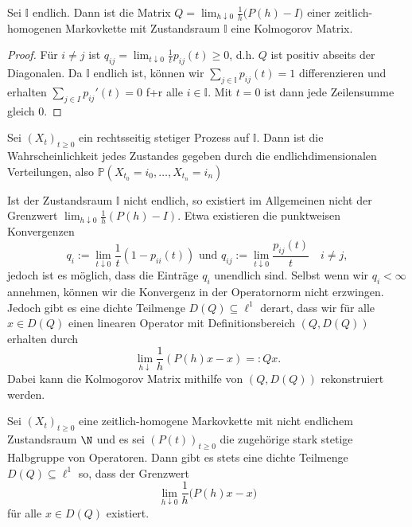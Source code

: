 \begin{prop}
Sei $\mathbb I$ endlich. Dann ist die Matrix $Q=\lim_{h\downarrow 0}\frac{1}{h}\big(P(h)-I\big)$ einer zeitlich-homogenen Markovkette mit Zustandsraum $\mathbb I$  eine Kolmogorov Matrix.
\end{prop}

\begin{proof}
Für $i\neq j$ ist $q_{ij}=\lim_{t\downarrow 0}\frac{1}{t}p_{ij}(t)\geq0$, d.h. $Q$ ist positiv abseits der Diagonalen. Da $\mathbb I$ endlich ist, können wir  $\sum_{j\in \mathbb I}p_{ij}(t)=1$ differenzieren und erhalten $\sum_{j\in I}p_{ij}'(t)=0$ f+r alle $i\in \mathbb I$. Mit $t=0$ ist dann jede Zeilensumme gleich $0$. 
\end{proof}



\begin{satz}
  Sei $(X_t)_{t\geq0}$ ein rechtsseitig stetiger Prozess auf $\mathbb I$. Dann ist die Wahrscheinlichkeit jedes Zustandes gegeben durch die endlichdimensionalen Verteilungen, also $\mathbb P(X_{t_0}=i_0,\dots,X_{t_n}=i_n)$ 
\end{satz}




\begin{bem}
Ist der Zustandsraum $\mathbb I$ nicht endlich, so existiert im Allgemeinen nicht der Grenzwert $\lim_{h\downarrow 0}\frac{1}{h}(P(h)-I)$. Etwa existieren die punktweisen Konvergenzen  $$q_i:=\lim_{t\downarrow0}\frac{1}{t}(1-p_{ii}(t))\text{ und } q_{ij}:=\lim_{t\downarrow 0}\frac{p_{ij}(t)}{t}\quad i\neq j,$$ jedoch ist es möglich, dass die Einträge $q_i$ unendlich sind. Selbst wenn wir $q_i<\infty$ annehmen, können wir die Konvergenz in der Operatornorm nicht erzwingen.  Jedoch gibt es eine dichte Teilmenge $D(Q)\subseteq\ell^1$ derart, dass wir für alle $x\in D(Q)$ einen linearen Operator mit Definitionsbereich $(Q,D(Q))$ erhalten durch  $$\lim_{h\downarrow}\frac{1}{h}(P(h)x-x)=:Qx.$$ 
Dabei kann die Kolmogorov Matrix mithilfe von $(Q,D(Q))$ rekonstruiert werden.
\end{bem}


\begin{satz}
  Sei $(X_t)_{t\geq0}$ eine zeitlich-homogene Markovkette mit nicht endlichem Zustandsraum $\mathbb \N$ und es sei $(P(t))_{t\geq0}$ die zugehörige stark stetige Halbgruppe von Operatoren. Dann gibt es stets eine dichte Teilmenge $D(Q)\subseteq\ell^1$ so, dass der Grenzwert$$\lim_{h\downarrow 0}\frac{1}{h}\big(P(h)x-x\big)$$  für alle $x\in D(Q)$ existiert. 
\end{satz}

